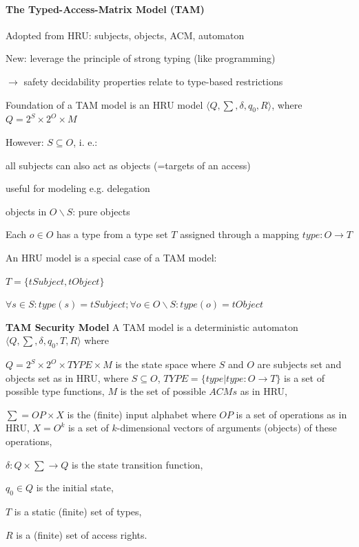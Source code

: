 \documentclass[a4paper]{article}
\renewcommand{\note}[2]{\begin{noteBox} \textbf{#1} #2 \end{noteBox}}
\begin{document}
\begin{multicols}{3}
    \paragraph{The Typed-Access-Matrix Model (TAM)}
    \begin{itemize*}
        \item Adopted from HRU: subjects, objects, ACM, automaton
        \item New: leverage the principle of strong typing (like programming)
        \item[$\rightarrow$] safety decidability properties relate to type-based restrictions
        \item Foundation of a TAM model is an HRU model $\langle Q,\sum,\delta,q_0 ,R\rangle$, where $Q= 2^S\times 2^O\times M$
        \item However: $S\subseteq O$, i. e.:
        \begin{itemize*}
            \item all subjects can also act as objects (=targets of an access)
            \item useful for modeling e.g. delegation
            \item objects in $O\backslash S$: pure objects
        \end{itemize*}
        \item Each $o\in O$ has a type from a type set $T$ assigned through a mapping $type:O\rightarrow T$
        \item An HRU model is a special case of a TAM model:
        \begin{itemize*}
            \item $T=\{tSubject,tObject\}$
            \item $\forall s\in S:type(s)=tSubject; \forall o\in O\backslash S:type(o)=tObject$
        \end{itemize*}
    \end{itemize*}

    \note{TAM Security Model}{A TAM model is a deterministic automaton $\langle Q,\sum,\delta,q_0 ,T,R\rangle$ where
        \begin{itemize*}
            \item $Q= 2^S\times 2^O\times TYPE\times M$ is the state space where $S$ and $O$ are subjects set and objects set as in HRU, where $S\subseteq O$, $TYPE=\{type|type:O\rightarrow T\}$ is a set of possible type functions, $M$ is the set of possible $ACMs$ as in HRU,
            \item $\sum=OP\times X$ is the (finite) input alphabet where $OP$ is a set of operations as in HRU, $X=O^k$ is a set of $k$-dimensional vectors of arguments (objects) of these operations,
            \item $\delta:Q\times\sum\rightarrow Q$ is the state transition function,
            \item $q_0\in Q$ is the initial state,
            \item $T$ is a static (finite) set of types,
            \item $R$ is a (finite) set of access rights.
        \end{itemize*}
    }


\end{multicols}
\end{document}
